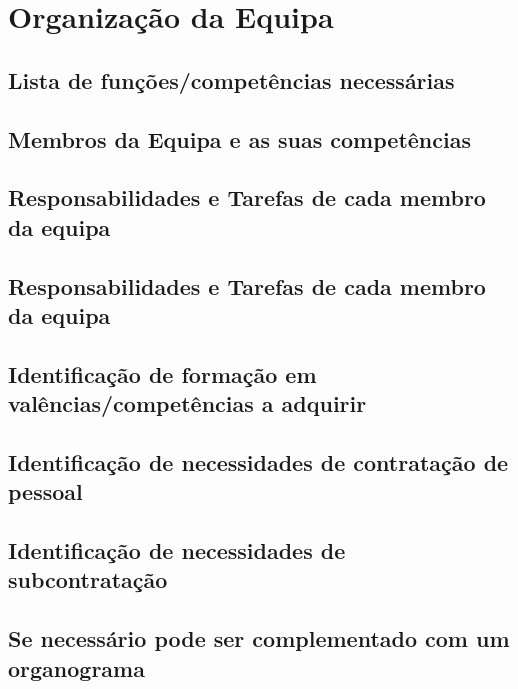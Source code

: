 \chapter{Organização da Equipa}
\label{organizacao_da_equipa}
\section{Lista de funções/competências necessárias}
\section{Membros da Equipa e as suas competências}
\section{Responsabilidades e Tarefas de cada membro da equipa}
\section{Responsabilidades e Tarefas de cada membro da equipa}
\section{Identificação de formação em valências/competências a adquirir}
\section{Identificação de necessidades de contratação de pessoal
}
\section{Identificação de necessidades de subcontratação}
\section{Se necessário pode ser complementado com um organograma}